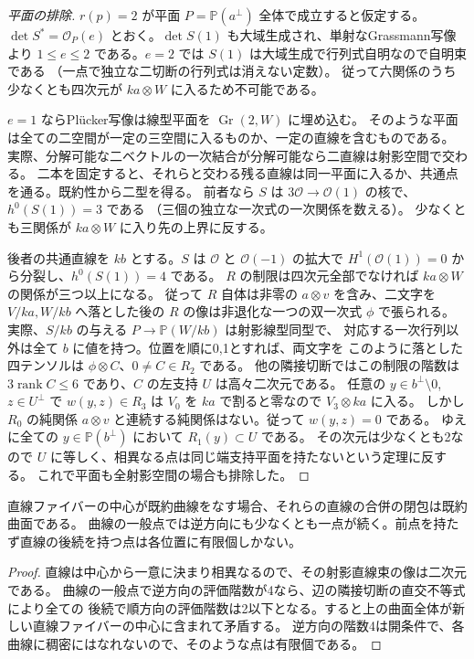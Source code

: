 \begin{proof}[平面の排除]
$r(p)=2$ が平面 $P=\mathbb P(a^\perp)$ 全体で成立すると仮定する。
$\det S^*=\mathcal O_P(e)$ とおく。$\det S(1)$ も大域生成され、単射なGrassmann写像より
$1\le e\le2$ である。$e=2$ では $S(1)$ は大域生成で行列式自明なので自明束である
（一点で独立な二切断の行列式は消えない定数）。
従って六関係のうち少なくとも四次元が $ka\otimes W$ に入るため不可能である。

$e=1$ ならPlücker写像は線型平面を $\operatorname{Gr}(2,W)$ に埋め込む。
そのような平面は全ての二空間が一定の三空間に入るものか、一定の直線を含むものである。
実際、分解可能な二ベクトルの一次結合が分解可能なら二直線は射影空間で交わる。
二本を固定すると、それらと交わる残る直線は同一平面に入るか、共通点を通る。既約性から二型を得る。
前者なら $S$ は $3\mathcal O\to\mathcal O(1)$ の核で、$h^0(S(1))=3$ である
（三個の独立な一次式の一次関係を数える）。
少なくとも三関係が $ka\otimes W$ に入り先の上界に反する。

後者の共通直線を $kb$ とする。$S$ は $\mathcal O$ と $\mathcal O(-1)$ の拡大で
$H^1(\mathcal O(1))=0$ から分裂し、$h^0(S(1))=4$ である。
$R$ の制限は四次元全部でなければ $ka\otimes W$ の関係が三つ以上になる。
従って $R$ 自体は非零の $a\otimes v$ を含み、二文字を
$V/ka,W/kb$ へ落とした後の $R$ の像は非退化な一つの双一次式 $\phi$ で張られる。
実際、$S/kb$ の与える $P\to\mathbb P(W/kb)$ は射影線型同型で、
対応する一次行列以外は全て $b$ に値を持つ。位置を順に0,1とすれば、両文字を
このように落とした四テンソルは $\phi\otimes C$、$0\ne C\in R_2$ である。
他の隣接切断ではこの制限の階数は $3\operatorname{rank} C\le6$ であり、$C$ の左支持 $U$ は高々二次元である。
任意の $y\in b^\perp\setminus0$, $z\in U^\perp$ で $w(y,z)\in R_3$ は
$V_0$ を $ka$ で割ると零なので $V_3\otimes ka$ に入る。
しかし $R_0$ の純関係 $a\otimes v$ と連続する純関係はない。従って $w(y,z)=0$ である。
ゆえに全ての $y\in\mathbb P(b^\perp)$ において $R_1(y)\subset U$ である。
その次元は少なくとも2なので $U$ に等しく、相異なる点は同じ端支持平面を持たないという定理に反する。
これで平面も全射影空間の場合も排除した。
\end{proof}

\begin{corollary}\label{cor:branching-curves-successor-surface}
直線ファイバーの中心が既約曲線をなす場合、それらの直線の合併の閉包は既約曲面である。
曲線の一般点では逆方向にも少なくとも一点が続く。前点を持たず直線の後続を持つ点は各位置に有限個しかない。
\end{corollary}
\begin{proof}
直線は中心から一意に決まり相異なるので、その射影直線束の像は二次元である。
曲線の一般点で逆方向の評価階数が4なら、辺の隣接切断の直交不等式により全ての
後続で順方向の評価階数は2以下となる。すると上の曲面全体が新しい直線ファイバーの中心に含まれて矛盾する。
逆方向の階数4は開条件で、各曲線に稠密にはなれないので、そのような点は有限個である。
\end{proof}
